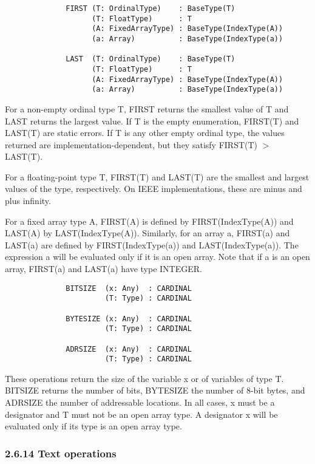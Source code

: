 \documentclass[10pt]{article}
\begin{document}
\begin{verbatim}
              FIRST (T: OrdinalType)    : BaseType(T)
                    (T: FloatType)      : T
                    (A: FixedArrayType) : BaseType(IndexType(A))
                    (a: Array)          : BaseType(IndexType(a))

              LAST  (T: OrdinalType)    : BaseType(T)
                    (T: FloatType)      : T
                    (A: FixedArrayType) : BaseType(IndexType(A))
                    (a: Array)          : BaseType(IndexType(a))
\end{verbatim}
For a non-empty ordinal type T, FIRST returns the smallest value of T and LAST
returns the largest value.  If T is the empty enumeration, FIRST(T) and LAST(T)
are static errors.  If T is any other empty ordinal type, the values returned
are implementation-dependent, but they satisfy FIRST(T) $>$ LAST(T).

For a floating-point type T, FIRST(T) and LAST(T) are the smallest and largest
values of the type, respectively.  On IEEE implementations, these are minus and
plus infinity.

For a fixed array type A, FIRST(A) is defined by FIRST(IndexType(A)) and
LAST(A) by LAST(IndexType(A)).  Similarly, for an array a, FIRST(a) and LAST(a)
are defined by FIRST(IndexType(a)) and LAST(IndexType(a)).  The expression a
will be evaluated only if it is an open array.  Note that if a is an open
array, FIRST(a) and LAST(a) have type INTEGER.

\begin{verbatim}
              BITSIZE  (x: Any)  : CARDINAL
                       (T: Type) : CARDINAL

              BYTESIZE (x: Any)  : CARDINAL
                       (T: Type) : CARDINAL

              ADRSIZE  (x: Any)  : CARDINAL
                       (T: Type) : CARDINAL
\end{verbatim}
These operations return the size of the variable x or of variables of type
T.  BITSIZE returns the number of bits, BYTESIZE the number of 8-bit bytes, and
ADRSIZE the number of addressable locations.  In all cases, x must be a
designator and T must not be an open array type.  A designator x will be
evaluated only if its type is an open array type.

\subsubsection*{2.6.14 Text operations}
\end{document}
